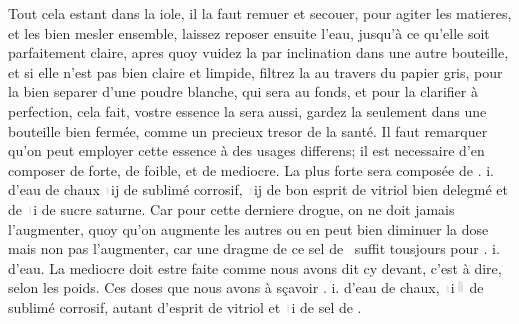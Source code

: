 \pend%
\pstart%
Tout cela estant dans la iole, il la faut remuer et secouer, pour agiter les matieres, et les bien mesler ensemble, laissez reposer ensuite l'eau, jusqu'\`{a} ce qu'elle soit parfaitement claire, apres quoy vuidez la par inclination dans une autre bouteille, et si elle n'est pas bien claire et limpide, filtrez la au travers du papier gris, pour la bien separer d'une poudre blanche, qui sera au fonds, et pour la clarifier \`{a} perfection, cela fait, vostre essence la sera aussi, gardez la seulement dans une bouteille bien ferm\'{e}e, comme un precieux tresor de la sant\'{e}. 
\pend%
\pstart%
Il faut remarquer qu'on peut employer cette essence \`{a} des usages differens; il est necessaire d'en composer de forte, de foible, et de mediocre. La plus forte sera compos\'{e}e de \Pfund. i. d'eau de chaux \includegraphics[width=0.013\textwidth]{images/drachma.pdf}ij de sublim\'{e} corrosif, \includegraphics[width=0.013\textwidth]{images/drachma.pdf}ij de bon esprit de vitriol bien delegm\'{e} et de \includegraphics[width=0.013\textwidth]{images/drachma.pdf}i de sucre saturne. Car pour cette derniere drogue, on ne doit jamais l'augmenter, quoy qu'on augmente les autres ou en peut bien diminuer la dose mais non pas l'augmenter, car une dragme de ce sel de \saturn\ suffit tousjours pour \Pfund. i. d'eau. 
\pend%
\pstart%
La mediocre doit estre faite comme nous avons dit cy devant, c'est \`{a} dire, selon les poids. Ces doses que nous avons  \`{a} s\c{c}avoir \Pfund. i. d'eau de chaux, \includegraphics[width=0.013\textwidth]{images/drachma.pdf}i\includegraphics[width=0.02\textwidth]{images/semi.pdf} de sublim\'{e} corrosif, autant d'esprit de vitriol et \includegraphics[width=0.013\textwidth]{images/drachma.pdf}i de sel de \saturn. 
\pend%
\pstart%
